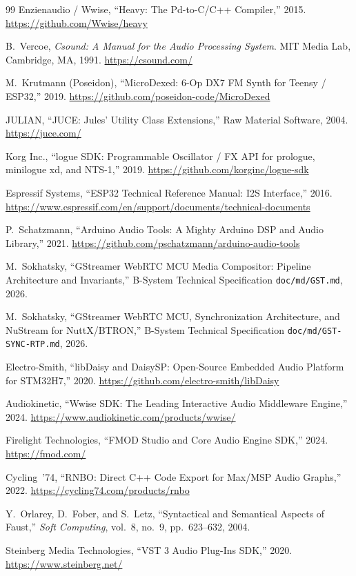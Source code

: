 \documentclass[10pt,journal,compsoc,twocolumn]{article}
\begin{document}
\begin{thebibliography}{99}
Enzienaudio / Wwise,
``Heavy: The Pd-to-C/C++ Compiler,'' 2015.
\url{https://github.com/Wwise/heavy}

B.~Vercoe,
\emph{Csound: A Manual for the Audio Processing System}.
MIT Media Lab, Cambridge, MA, 1991.
\url{https://csound.com/}

M.~Krutmann (Poseidon),
``MicroDexed: 6-Op DX7 FM Synth for Teensy / ESP32,'' 2019.
\url{https://github.com/poseidon-code/MicroDexed}

JULIAN,
``JUCE: Jules' Utility Class Extensions,'' Raw Material Software, 2004.
\url{https://juce.com/}

Korg Inc.,
``logue SDK: Programmable Oscillator / FX API for prologue, minilogue xd,
and NTS-1,'' 2019.
\url{https://github.com/korginc/logue-sdk}

Espressif Systems,
``ESP32 Technical Reference Manual: I2S Interface,'' 2016.
\url{https://www.espressif.com/en/support/documents/technical-documents}

P.~Schatzmann,
``Arduino Audio Tools: A Mighty Arduino DSP and Audio Library,'' 2021.
\url{https://github.com/pschatzmann/arduino-audio-tools}

M.~Sokhatsky,
``GStreamer WebRTC MCU Media Compositor: Pipeline Architecture and Invariants,''
B-System Technical Specification \texttt{doc/md/GST.md}, 2026.

M.~Sokhatsky,
``GStreamer WebRTC MCU, Synchronization Architecture, and NuStream for NuttX/BTRON,''
B-System Technical Specification \texttt{doc/md/GST-SYNC-RTP.md}, 2026.

Electro-Smith,
``libDaisy and DaisySP: Open-Source Embedded Audio Platform for STM32H7,'' 2020.
\url{https://github.com/electro-smith/libDaisy}

Audiokinetic,
``Wwise SDK: The Leading Interactive Audio Middleware Engine,'' 2024.
\url{https://www.audiokinetic.com/products/wwise/}

Firelight Technologies,
``FMOD Studio and Core Audio Engine SDK,'' 2024.
\url{https://fmod.com/}

Cycling~'74,
``RNBO: Direct C++ Code Export for Max/MSP Audio Graphs,'' 2022.
\url{https://cycling74.com/products/rnbo}

Y.~Orlarey, D.~Fober, and S.~Letz,
``Syntactical and Semantical Aspects of Faust,''
\emph{Soft Computing}, vol.~8, no.~9, pp.~623--632, 2004.

Steinberg Media Technologies,
``VST 3 Audio Plug-Ins SDK,'' 2020.
\url{https://www.steinberg.net/}

\end{thebibliography}
\end{document}
